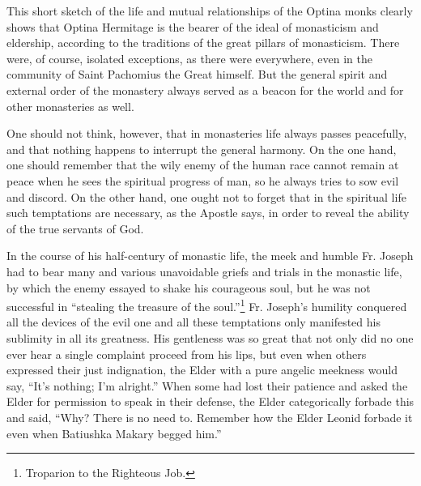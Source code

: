 This short sketch of the life and mutual relationships of the Optina monks clearly shows that Optina Hermitage is the bearer of the ideal of monasticism and eldership, according to the traditions of the great pillars of monasticism. There were, of course, isolated exceptions, as there were everywhere, even in the community of Saint Pachomius the Great himself. But the general spirit and external order of the monastery always served as a beacon for the world and for other monasteries as well.

One should not think, however, that in monasteries life always passes peacefully, and that nothing happens to interrupt the general harmony. On the one hand, one should remember that the wily enemy of the human race cannot remain at peace when he sees the spiritual progress of man, so he always tries to sow evil and discord. On the other hand, one ought not to forget that in the spiritual life such temptations are necessary, as the Apostle says, in order to reveal the ability of the true servants of God.

In the course of his half-century of monastic life, the meek and humble Fr. Joseph had to bear many and various unavoidable griefs and trials in the monastic life, by which the enemy essayed to shake his courageous soul, but he was not successful in ``stealing the treasure of the soul.''\footnote{Troparion to the Righteous Job.} Fr. Joseph's humility conquered all the devices of the evil one and all these temptations only manifested his sublimity in all its greatness. His gentleness was so great that not only did no one ever hear a single complaint proceed from his lips, but even when others expressed their just indignation, the Elder with a pure angelic meekness would say, ``It's nothing; I'm alright.'' When some had lost their patience and asked the Elder for permission to speak in their defense, the Elder categorically forbade this and said, ``Why? There is no need to. Remember how the Elder Leonid forbade it even when Batiushka Makary begged him.''
